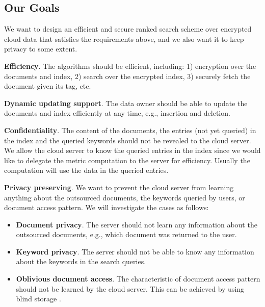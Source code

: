 \documentclass{IEEEtran}
\begin{document}
\subsection{Our Goals}
We want to design an efficient and secure ranked search scheme over encrypted cloud data that satisfies the requirements above, and we also want it to keep privacy to some extent.

\textbf{Efficiency}. The algorithms should be efficient, including: 1) encryption over the documents and index, 2) search over the encrypted index, 3) securely fetch the document given its tag, etc.

\textbf{Dynamic updating support}. The data owner should be able to update the documents and index efficiently at any time, e.g., insertion and deletion.

\textbf{Confidentiality}. The content of the documents, the entries (not yet queried) in the index and the queried keywords should not be revealed to the cloud server. We allow the cloud server to know the queried entries in the index since we would like to delegate the metric computation to the server for efficiency. Usually the computation will use the data in the queried entries.

\textbf{Privacy preserving}. We want to prevent the cloud server from learning anything about the outsourced documents, the keywords queried by users, or document access pattern. We will investigate the cases as follows:
\begin{itemize}
\item \textbf{Document privacy}. The server should not learn any information about the outsourced documents, e.g., which document was returned to the user.
\item \textbf{Keyword privacy}. The server should not be able to know any information about the keywords in the search queries.
\item \textbf{Oblivious document access}. The characteristic of document access pattern should not be learned by the cloud server. This can be achieved by using blind storage \cite{NPG14}.
\end{itemize}
\end{document}
